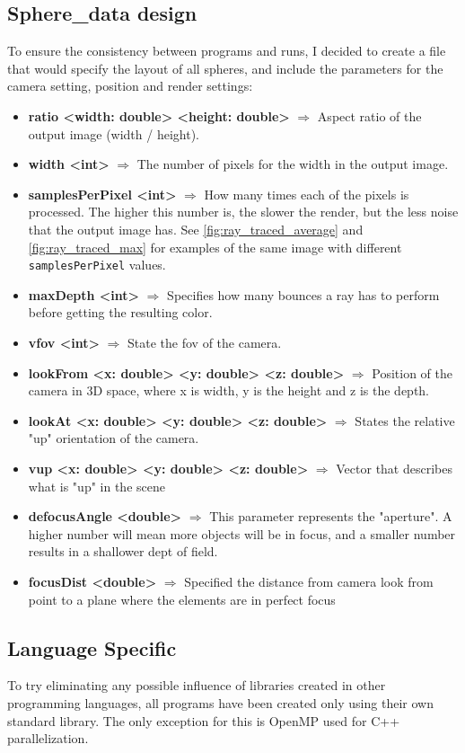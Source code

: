 \subsection{Sphere\_data design}

To ensure the consistency between programs and runs, I decided to create a file that would specify the layout of all spheres, and include the parameters for the camera setting, position and render settings:
\begin{itemize}
    \item \textbf{ratio <width: double> <height: double>} $\Rightarrow{}$ Aspect ratio of the output image (width / height).
    \item \textbf{width <int>} $\Rightarrow{}$ The number of pixels for the width in the output image.
    \item \textbf{samplesPerPixel <int>} $\Rightarrow{}$ How many times each of the pixels is processed. The higher this number is, the slower the render, but the less noise that the output image has. See \autoref{fig:ray_traced_average} and \autoref{fig:ray_traced_max} for examples of the same image with different \texttt{samplesPerPixel} values.
    \item \textbf{maxDepth <int>} $\Rightarrow{}$ Specifies how many bounces a ray has to perform before getting the resulting color.
    \item \textbf{vfov <int>} $\Rightarrow{}$ State the \gls{fov} of the camera.
    \item \textbf{lookFrom <x: double> <y: double> <z: double>} $\Rightarrow{}$ Position of the camera in 3D space, where x is width, y is the height and z is the depth.
    \item \textbf{lookAt <x: double> <y: double> <z: double>} $\Rightarrow{}$ States the relative "up" orientation of the camera.
    \item \textbf{vup <x: double> <y: double> <z: double>} $\Rightarrow{}$ Vector that describes what is "up" in the scene
    \item \textbf{defocusAngle <double>} $\Rightarrow{}$ This parameter represents the "aperture". A higher number will mean more objects will be in focus, and a smaller number results in a shallower dept of field.
    \item \textbf{focusDist <double>} $\Rightarrow{}$ Specified the distance from camera look from point to a plane where the elements are in perfect focus
\end{itemize}

\subsection{Language Specific}
To try eliminating any possible influence of libraries created in other programming languages, all programs have been created only using their own standard library. The only exception for this is OpenMP used for C++ parallelization.

